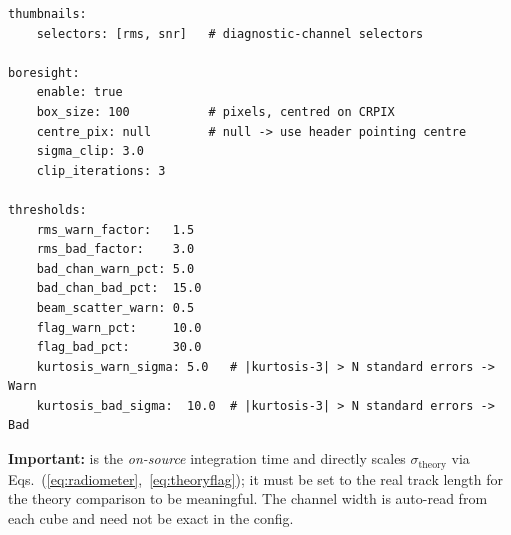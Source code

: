 \documentclass[11pt,a4paper]{article}
\begin{document}
\begin{lstlisting}
thumbnails:
    selectors: [rms, snr]   # diagnostic-channel selectors

boresight:
    enable: true
    box_size: 100           # pixels, centred on CRPIX
    centre_pix: null        # null -> use header pointing centre
    sigma_clip: 3.0
    clip_iterations: 3

thresholds:
    rms_warn_factor:   1.5
    rms_bad_factor:    3.0
    bad_chan_warn_pct: 5.0
    bad_chan_bad_pct:  15.0
    beam_scatter_warn: 0.5
    flag_warn_pct:     10.0
    flag_bad_pct:      30.0
    kurtosis_warn_sigma: 5.0   # |kurtosis-3| > N standard errors -> Warn
    kurtosis_bad_sigma:  10.0  # |kurtosis-3| > N standard errors -> Bad
\end{lstlisting}

\noindent\textbf{Important:}  is the \emph{on-source}
integration time and directly scales $\sigma_{\mathrm{theory}}$ via
Eqs.~(\ref{eq:radiometer},~\ref{eq:theoryflag}); it must be set to the real
track length for the theory comparison to be meaningful. The channel width
 is auto-read from each cube and need not be exact in the config.

\end{document}
